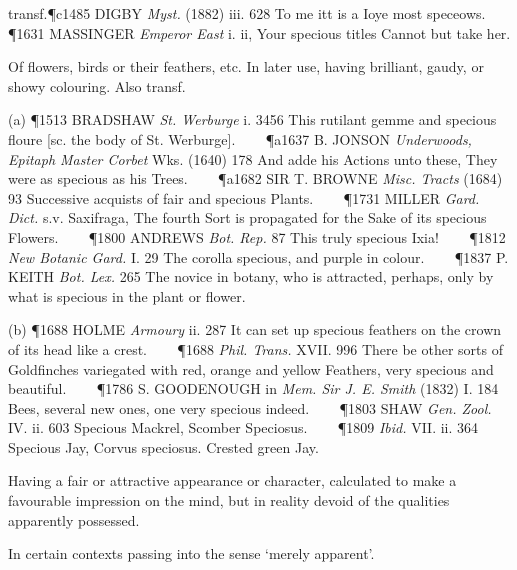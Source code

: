 \begin{description}[wide, labelwidth=!, labelindent=0pt]
\begin{myenumerate}
transf.\P c1485 DIGBY  \textit{Myst.} (1882) iii. 628 To me itt is a Ioye most speceows.    
\P 1631 MASSINGER  \textit{Emperor East} i. ii, Your specious titles Cannot but take her.

 Of flowers, birds or their feathers, etc. In later use, having brilliant, gaudy, or showy colouring. Also transf.

(a) \P 1513 BRADSHAW  \textit{St. Werburge} i. 3456 This rutilant gemme and specious floure [sc. the body of St. Werburge].    
\P a1637 B. JONSON  \textit{Underwoods, Epitaph Master Corbet} Wks. (1640) 178 And adde his Actions unto these, They were as specious as his Trees.    
\P a1682 SIR T. BROWNE  \textit{Misc. Tracts} (1684) 93 Successive acquists of fair and specious Plants.    
\P 1731 MILLER  \textit{Gard. Dict.} s.v. Saxifraga, The fourth Sort is propagated for the Sake of its specious Flowers.    
\P 1800 ANDREWS  \textit{Bot. Rep.} 87 This truly specious Ixia!    
\P 1812  \textit{New Botanic Gard.} I. 29 The corolla specious, and purple in colour.    
\P 1837 P. KEITH  \textit{Bot. Lex.} 265 The novice in botany, who is attracted, perhaps, only by what is specious in the plant or flower.

(b) \P 1688 HOLME  \textit{Armoury} ii. 287 It can set up specious feathers on the crown of its head like a crest.    
\P 1688  \textit{Phil. Trans.} XVII. 996 There be other sorts of Goldfinches variegated with red, orange and yellow Feathers, very specious and beautiful.    
\P 1786 S. GOODENOUGH in  \textit{Mem. Sir J. E. Smith} (1832) I. 184 Bees, several new ones, one very specious indeed.    
\P 1803 SHAW  \textit{Gen. Zool.} IV. ii. 603 Specious Mackrel, Scomber Speciosus.    
\P 1809  \textit{Ibid.} VII. ii. 364 Specious Jay, Corvus speciosus. Crested green Jay.

 Having a fair or attractive appearance or character, calculated to make a favourable impression on the mind, but in reality devoid of the qualities apparently possessed.

In certain contexts passing into the sense ‘merely apparent’.


\end{myenumerate}
\end{description}
